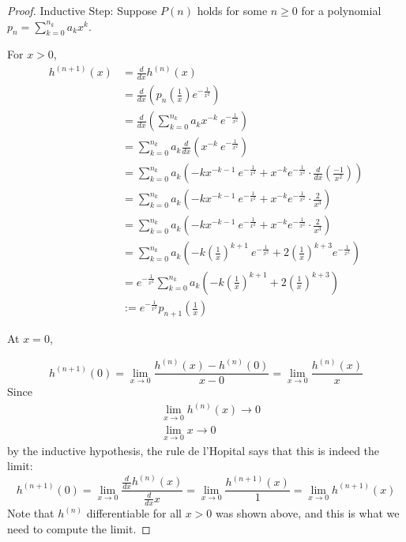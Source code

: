 \documentclass[12pt, reqno]{amsart}
\theoremstyle{definition}
\theoremstyle{remark}
\begin{document}
\begin{itemize}
\begin{itemize}
\begin{proof}
    Inductive Step: Suppose $P(n)$ holds for some $n\ge0$ for a polynomial $p_{n}=\sum_{k=0}^{n_{k}}a_{k}x^{k}$. 
    
    For $x>0$, \begin{align*}
    h^{(n+1)}(x)&= \frac{d}{dx}h^{(n)}(x)\\
    &= \frac{d}{dx} \left(p_{n}\left(\frac{1}{x}\right)e^{- \frac{1}{x^{2}}}\right)\\
    &= \frac{d}{dx} \left(\sum_{k=0}^{n_{k}}a_{k}x^{-k}~e^{-\frac{1}{x^{2}}}\right)\\
    &= \sum_{k=0}^{n_{k}} a_{k}\frac{d}{dx}\left( x^{-k}~e^{-\frac{1}{x^{2}}}\right)\\
    &= \sum_{k=0}^{n_{k}} a_{k}\left( -kx^{-k-1}~e^{-\frac{1}{x^{2}}}+x^{-k}e^{- \frac{1}{x^{2}}}\cdot \frac{d}{dx} \left(\frac{-1}{x^{2}}\right)\right)\\
    &= \sum_{k=0}^{n_{k}} a_{k}\left( -kx^{-k-1}~e^{-\frac{1}{x^{2}}}+x^{-k}e^{- \frac{1}{x^{2}}}\cdot \frac{2}{x^{3}}\right)\\
    &= \sum_{k=0}^{n_{k}} a_{k}\left(-kx^{-k-1}~e^{-\frac{1}{x^{2}}}+x^{-k}e^{- \frac{1}{x^{2}}}\cdot \frac{2}{x^{3}}\right)\\
    &= \sum_{k=0}^{n_{k}} a_{k}\left(-k \left(\frac{1}{x}\right)^{k+1}~e^{-\frac{1}{x^{2}}}+2\left(\frac{1}{x}\right)^{k+3}e^{- \frac{1}{x^{2}}}\right)\\
    &= e^{- \frac{1}{x^{2}}}\sum_{k=0}^{n_{k}} a_{k}\left(-k \left(\frac{1}{x}\right)^{k+1}+2\left(\frac{1}{x}\right)^{k+3}\right)\\
    &:= e^{- \frac{1}{x^{2}}}p_{n+1}\left(\frac{1}{x}\right)
    \end{align*}
    
    
    At $x=0$, 
    
    $$h^{(n+1)}(0)=\lim_{x \rightarrow 0} \frac{h^{(n)}(x)-h^{(n)}(0)}{x-0}=\lim_{x \rightarrow 0} \frac{h^{(n)}(x)}{x}$$
    Since \begin{align*}
    &\lim_{x \rightarrow 0}h^{(n)}(x)\rightarrow 0\\
    &\lim_{x \rightarrow 0}x\rightarrow 0
    \end{align*}by the inductive hypothesis, the rule de l'Hopital says that this is indeed the limit: $$h^{(n+1)}(0)=\lim_{x \rightarrow 0} \frac{\frac{d}{dx}h^{(n)}(x)}{\frac{d}{dx}x}=\lim_{x \rightarrow 0} \frac{h^{(n+1)}(x)}{1}=\lim_{x\rightarrow 0}h^{(n+1)}(x)$$Note that $h^{(n)}$ differentiable for all $x>0$ was shown above, and this is what we need to compute the limit. 
    \vspace*{10  pt}
    

\end{proof}
\end{itemize}
\end{itemize}
\end{document}
